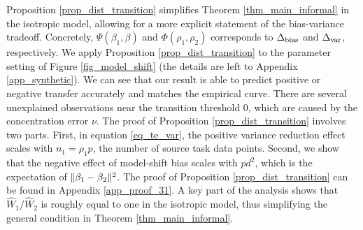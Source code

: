 Proposition \ref{prop_dist_transition} simplifies Theorem \ref{thm_main_informal} in the isotropic model, allowing for a more explicit statement of the bias-variance tradeoff.
Concretely, $\Psi(\beta_1, \beta)$ and $\Phi(\rho_1, \rho_2)$ corresponds to $\Delta_{\text{bias}}$ and $\Delta_{\text{var}}$, respectively.
We apply Proposition \ref{prop_dist_transition} to the parameter setting of Figure \ref{fig_model_shift} (the details are left to Appendix \ref{app_synthetic}).
We can see that our result is able to predict positive or negative transfer  accurately and matches the empirical curve.
There are several unexplained observations near the transition threshold $0$, which are caused by the concentration error $\nu$.
The proof of Proposition \ref{prop_dist_transition} involves two parts.
First, in equation \eqref{eq_te_var}, the positive variance reduction effect scales with $n_1 = \rho_1 p$, the number of source task data points.
Second, we show that the negative effect of model-shift bias scales with $pd^2$, which is the expectation of $\|\beta_1 - \beta_2\|^2$.
The proof of Proposition \ref{prop_dist_transition} can be found in Appendix \ref{app_proof_31}.
A key part of the analysis shows that $\hat{W}_1 / \hat{W}_2$ is roughly equal to one in the isotropic model,
thus simplifying the general condition in Theorem \ref{thm_main_informal}.

